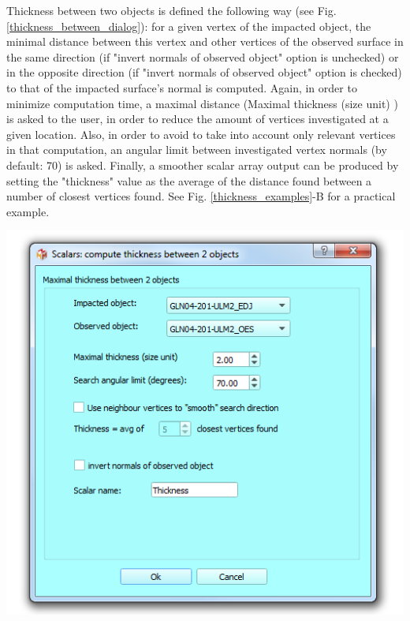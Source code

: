 \noindent
\begin{minipage}{0.5\textwidth}
Thickness between two objects is defined the following way (see Fig. \ref{thickness_between_dialog}):
for a given vertex of the impacted object, the minimal distance
between this vertex and other vertices of the observed surface in
the same direction (if "invert normals of observed object" option is unchecked) or in the opposite direction (if "invert normals of observed object" option is checked) to that of the impacted surface's normal is computed. Again, in order to minimize computation time, a maximal distance (Maximal thickness (size unit) ) is asked to the user, in order to reduce the amount of vertices investigated at a given location. Also, in order to avoid to take into account only relevant vertices in that computation, an angular limit between investigated vertex normals (by default: 70\degree) is asked. Finally, a smoother scalar array output can be produced by setting the "thickness" value as the average of the distance found between a number of closest vertices found. See Fig. \ref{thickness_examples}-B for a practical example.
\end{minipage}    
\begin{minipage}{0.5\textwidth}\centering
  \includegraphics[scale=0.5]{images/11/thickness_between_dialog.png}
\label{thickness_between_dialog}
 \end{minipage} 
\noindent


